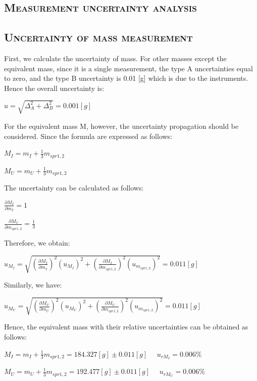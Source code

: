 \documentclass[a4paper,12pt]{article}
\begin{document}
\begin{appendices} 
      \section{\textsc{Measurement uncertainty analysis}} 
      \subsection{\textsc{Uncertainty of mass measurement}}      
      First, we calculate the uncertainty of mass. For other masses except the equivalent mass, since it is a single measurement, the type A uncertainties equal to zero, and the type B uncertainty is 0.01 [g] which is due to the instruments. Hence the overall uncertainty is:
      \begin{center}
      $u = \sqrt{\Delta_A^2 + \Delta_B^2} = 0.001 [g]$
      \end{center}
      For the equivalent mass M, however, the uncertainty propagation should be considered. Since the formula are expressed as follows:
      \begin{center}
      $ \displaystyle M_I = m_I + \frac{1}{3}m_{spr1,2} $
      \end{center}
      \begin{center}
      $ \displaystyle M_U = m_U + \frac{1}{3}m_{spr1,2} $
      \end{center}
      The uncertainty can be calculated as follows:
      \begin{center}
      $ \displaystyle \frac{\partial M_I}{\partial{m_I}} = 1 $
      \end{center}
       \begin{center}
      $ \displaystyle \frac{\partial M_I}{\partial{m_{spr1,2}}} = \frac{1}{3} $
      \end{center}
      Therefore, we obtain:
      \begin{center}
      $ \displaystyle u_{M_I} = \sqrt{(\frac{\partial M_I}{\partial{m_I}})^2(u_{M_I})^2 + (\frac{\partial M_I}{\partial{m_{spr1,2}}})^2(u_{m_{spr1,2}})^2} = 0.011 [g]$
      \end{center}
      Similarly, we have:
      \begin{center}
      $ \displaystyle u_{M_U} = \sqrt{(\frac{\partial M_U}{\partial{m_U}})^2(u_{M_U})^2 + (\frac{\partial M_U}{\partial{m_{spr1,2}}})^2(u_{m_{spr1,2}})^2} = 0.011 [g]$
      \end{center}
      Hence, the equivalent mass with their relative uncertainties can be obtained as follows:
      \begin{center}
      $ \displaystyle M_I = m_I + \frac{1}{3}m_{spr1,2} = 184.327 [g] \pm 0.011 [g] ~~~~~~ u_{rM_I} = 0.006\%$
      \end{center}
      \begin{center}
      $ \displaystyle M_U = m_U + \frac{1}{3}m_{spr1,2} = 192.477 [g] \pm 0.011 [g] ~~~~~~ u_{rM_U} = 0.006\%$
      \end{center}

\end{appendices}
\end{document}
